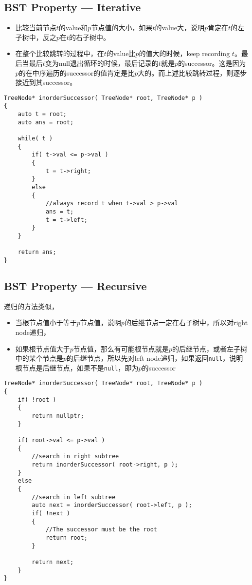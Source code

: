 \subsection{BST Property --- Iterative}
\begin{itemize}
    \item 比较当前节点$t$的value和$p$节点值的大小，如果$t$的value大，说明$p$肯定在$t$的左子树中，反之$p$在$t$的右子树中。
    \item 在整个比较跳转的过程中，在$t$的value比$p$的值大的时候，keep recording $t$。最后当最后$t$变为null退出循环的时候，最后记录的$t$就是$p$的successor。这是因为$p$的在中序遍历的successor的值肯定是比$p$大的。而上述比较跳转过程，则逐步接近到其successor。
\end{itemize}
\begin{lstlisting}[style=customc, caption={BST Property --- Iterative}]
TreeNode* inorderSuccessor( TreeNode* root, TreeNode* p )
{
    auto t = root;
    auto ans = root;

    while( t )
    {
        if( t->val <= p->val )
        {
            t = t->right;
        }
        else
        {
            //always record t when t->val > p->val
            ans = t;
            t = t->left;
        }
    }

    return ans;
}
\end{lstlisting}
\subsection{BST Property --- Recursive}
递归的方法类似，
\begin{itemize}
    \item 当根节点值小于等于$p$节点值，说明$p$的后继节点一定在右子树中，所以对right node递归，
    \item 如果根节点值大于$p$节点值，那么有可能根节点就是$p$的后继节点，或者左子树中的某个节点是$p$的后继节点，所以先对left node递归，如果返回\texttt{null}，说明根节点是后继节点，如果不是\texttt{null}，即为$p$的successor
\end{itemize}
\begin{lstlisting}[style=customc, caption={BST Property --- Recursive}]
TreeNode* inorderSuccessor( TreeNode* root, TreeNode* p )
{
    if( !root )
    {
        return nullptr;
    }

    if( root->val <= p->val )
    {
        //search in right subtree
        return inorderSuccessor( root->right, p );
    }
    else
    {
        //search in left subtree
        auto next = inorderSuccessor( root->left, p );
        if( !next )
        {
            //The successor must be the root
            return root;
        }

        return next;
    }
}
\end{lstlisting}
